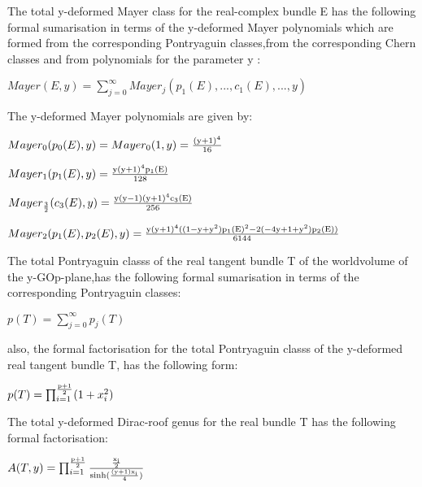 \documentclass[a4paper,a4paper]{article}
\begin{document}
The total  y-deformed Mayer class for the real-complex  bundle E has the following formal sumarisation in terms of the y-deformed  Mayer polynomials which are formed from the corresponding Pontryaguin classes,from the corresponding Chern classes and from polynomials for the parameter y :
\begin{center}
{  $ Mayer(E,y) = \sum_{j=0}^{\infty}Mayer_j(p_1(E),...,c_1(E),...,y) $ }
\end{center}
The y-deformed Mayer polynomials are given by:
\begin{center}
{  $ Mayer_0(p_0(E),y) = Mayer_0(1,y)= \frac{\rm (y+1)^4}{\rm 16} $ }
\end{center}
\begin{center}
{  $ Mayer_1(p_1(E),y) = \frac{\rm y(y+1)^4p_1(E)}{\rm 128} $ }
\end{center}
\begin{center}
{  $ Mayer_\frac{\rm 3}{\rm 2}(c_3(E),y) = \frac{\rm y(y-1)(y+1)^4c_3(E)}{\rm 256} $ }
\end{center}
\begin{center}
{  $ Mayer_2(p_1(E),p_2(E),y) = \frac{\rm y(y+1)^4((1-y+y^2)p_1(E)^2-2(-4y+1+y^2)p_2(E))}{\rm 6144} $ }
\end{center}
The total Pontryaguin classs of the real tangent bundle T of the worldvolume of the y-GOp-plane,has the following formal sumarisation in terms of the corresponding Pontryaguin classes: 
\begin{center}
{  $ p(T) = \sum_{j=0}^{\infty}p_j(T) $ }
\end{center}
also, the formal factorisation for the total Pontryaguin classs of the y-deformed real tangent bundle T,  has the following form:

\begin{center}
{  $ p(T) = \prod_{i=1}^{\frac{\rm p+1}{\rm 2}}(1+x_i^2)$ }
\end{center}
The total  y-deformed Dirac-roof genus for the real bundle T has the following formal factorisation:

\begin{center}
{  $ A(T,y) = \prod_{i=1}^{\frac{\rm p+1}{\rm 2}}\frac{\rm\frac{\rm x_i}{\rm 2} }{\rm sinh(\frac{\rm (y+1)x_i}{\rm 4})}$ }
\end{center}
\end{document}
